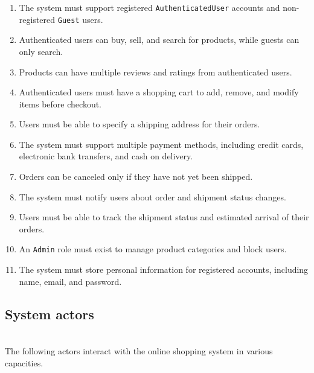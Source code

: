 \begin{enumerate}
\item
\protect{}\label{MD529woe0XLdL_NGM1e3w}
The system must support registered \texttt{AuthenticatedUser} accounts and non-registered \texttt{Guest} users.
\item
\protect{}\label{ja5YmfNzcs8-ii-_wqEqE}
Authenticated users can buy, sell, and search for products, while guests can only search.
\item
\protect{}\label{54Gs8NcUEgpjCRt5Rr-o1}
Products can have multiple reviews and ratings from authenticated users.
\item
\protect{}\label{8BlVnjI3uFIGs9wbpkWBh}
Authenticated users must have a shopping cart to add, remove, and modify items before checkout.
\item
\protect{}\label{g3_EcvqoPvdIcyCWRchue}
Users must be able to specify a shipping address for their orders.
\item
\protect{}\label{WW3yWYdNMtLuClo_DWgKm}
The system must support multiple payment methods, including credit cards, electronic bank transfers, and cash on delivery.
\item
\protect{}\label{nJjkcnbn9806M5L3jfK5c}
Orders can be canceled only if they have not yet been shipped.
\item
\protect{}\label{2ly6kBl57CtraTn6VEBVz}
The system must notify users about order and shipment status changes.
\item
\protect{}\label{gMF70dgsAwWScSBW9qzuh}
Users must be able to track the shipment status and estimated arrival of their orders.
\item
\protect{}\label{aIvHGZChP4VSyEckZwiZ2}
An \texttt{Admin} role must exist to manage product categories and block users.
\item
\protect{}\label{YlLE_sW8ic89VYMJLeq9B}
The system must store personal information for registered accounts, including name, email, and password.
\end{enumerate}

\subsection{System actors}\label{btNo-3hDwyji-mMZJSeyS}
\\
The following actors interact with the online shopping system in various capacities.

